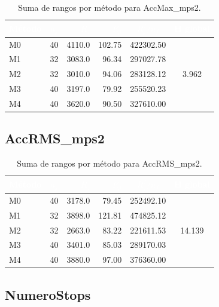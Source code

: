 \documentclass[12pt,a4paper,oneside]{book}
\begin{document}
\begin{table}[H]
\centering
\small
\caption{Suma de rangos por método para AccMax\_mps2.}
\begin{tabular}{lcrrcc}
\toprule
\rowcolor{primary}
\textcolor{white}{\textbf{Método}} & \textcolor{white}{$n_j$} & \textcolor{white}{$R_j$} & \textcolor{white}{$\bar{R}_j$} & \textcolor{white}{$R_j^2/n_j$} & \textcolor{white}{H global} \\
\midrule
M0 & 40 & 4110.0 & 102.75 & 422302.50 & \multirow{5}{*}{3.962} \\
M1 & 32 & 3083.0 & 96.34 & 297027.78 & \\
M2 & 32 & 3010.0 & 94.06 & 283128.12 & \\
M3 & 40 & 3197.0 & 79.92 & 255520.23 & \\
M4 & 40 & 3620.0 & 90.50 & 327610.00 & \\
\bottomrule
\end{tabular}
\end{table}

\subsection{AccRMS\_mps2}

\begin{table}[H]
\centering
\small
\caption{Suma de rangos por método para AccRMS\_mps2.}
\begin{tabular}{lcrrcc}
\toprule
\rowcolor{primary}
\textcolor{white}{\textbf{Método}} & \textcolor{white}{$n_j$} & \textcolor{white}{$R_j$} & \textcolor{white}{$\bar{R}_j$} & \textcolor{white}{$R_j^2/n_j$} & \textcolor{white}{H global} \\
\midrule
M0 & 40 & 3178.0 & 79.45 & 252492.10 & \multirow{5}{*}{14.139} \\
M1 & 32 & 3898.0 & 121.81 & 474825.12 & \\
M2 & 32 & 2663.0 & 83.22 & 221611.53 & \\
M3 & 40 & 3401.0 & 85.03 & 289170.03 & \\
M4 & 40 & 3880.0 & 97.00 & 376360.00 & \\
\bottomrule
\end{tabular}
\end{table}

\subsection{NumeroStops}
\end{document}
